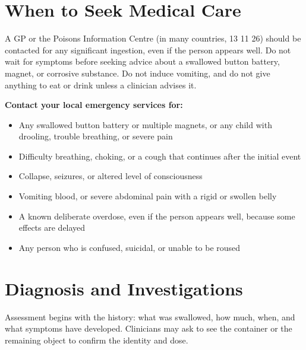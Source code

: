 \section*{When to Seek Medical Care}
A GP or the Poisons Information Centre (in many countries, 13 11 26) should be contacted for any significant ingestion, even if the person appears well. Do not wait for symptoms before seeking advice about a swallowed button battery, magnet, or corrosive substance. Do not induce vomiting, and do not give anything to eat or drink unless a clinician advises it.

\textbf{Contact your local emergency services for:}
\begin{itemize}
    \item Any swallowed button battery or multiple magnets, or any child with drooling, trouble breathing, or severe pain
    \item Difficulty breathing, choking, or a cough that continues after the initial event
    \item Collapse, seizures, or altered level of consciousness
    \item Vomiting blood, or severe abdominal pain with a rigid or swollen belly
    \item A known deliberate overdose, even if the person appears well, because some effects are delayed
    \item Any person who is confused, suicidal, or unable to be roused
\end{itemize}

\section*{Diagnosis and Investigations}
Assessment begins with the history: what was swallowed, how much, when, and what symptoms have developed. Clinicians may ask to see the container or the remaining object to confirm the identity and dose.

